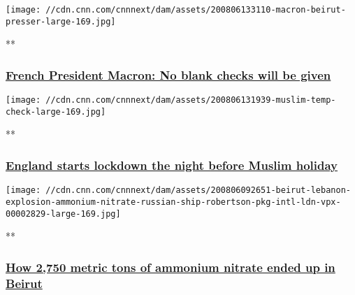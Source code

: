 \texttt{[image: //cdn.cnn.com/cnnnext/dam/assets/200806133110-macron-beirut-presser-large-169.jpg]}

**

\hypertarget{french-president-macron-no-blank-checks-will-be-given}{%
\subsubsection{\texorpdfstring{\href{/videos/world/2020/08/06/emmanuel-macron-lebanon-leaders-blank-check-sot-vpx.afptv/video/playlists/around-the-world/}{French
President Macron: No blank checks will be
given}}{French President Macron: No blank checks will be given}}\label{french-president-macron-no-blank-checks-will-be-given}}

\href{/videos/world/2020/08/06/england-lockdown-on-eid-eve-muslims-veselinovic-vpx.cnn/video/playlists/around-the-world/}{}

\texttt{[image: //cdn.cnn.com/cnnnext/dam/assets/200806131939-muslim-temp-check-large-169.jpg]}

**

\hypertarget{england-starts-lockdown-the-night-before-muslim-holiday}{%
\subsubsection{\texorpdfstring{\href{/videos/world/2020/08/06/england-lockdown-on-eid-eve-muslims-veselinovic-vpx.cnn/video/playlists/around-the-world/}{England
starts lockdown the night before Muslim
holiday}}{England starts lockdown the night before Muslim holiday}}\label{england-starts-lockdown-the-night-before-muslim-holiday}}

\href{/videos/world/2020/08/06/beirut-lebanon-explosion-ammonium-nitrate-russian-ship-robertson-pkg-intl-ldn-vpx.cnn/video/playlists/around-the-world/}{}

\texttt{[image: //cdn.cnn.com/cnnnext/dam/assets/200806092651-beirut-lebanon-explosion-ammonium-nitrate-russian-ship-robertson-pkg-intl-ldn-vpx-00002829-large-169.jpg]}

**

\hypertarget{how-2750-metric-tons-of-ammonium-nitrate-ended-up-in-beirut}{%
\subsubsection{\texorpdfstring{\href{/videos/world/2020/08/06/beirut-lebanon-explosion-ammonium-nitrate-russian-ship-robertson-pkg-intl-ldn-vpx.cnn/video/playlists/around-the-world/}{How
2,750 metric tons of ammonium nitrate ended up in
Beirut}}{How 2,750 metric tons of ammonium nitrate ended up in Beirut}}\label{how-2750-metric-tons-of-ammonium-nitrate-ended-up-in-beirut}}

